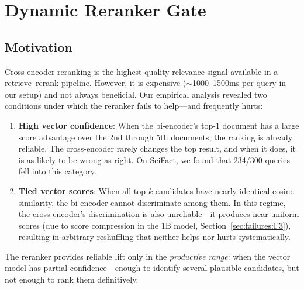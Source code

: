 \documentclass[11pt]{article}
\begin{document}
\section{Dynamic Reranker Gate}
\label{sec:gate}

\subsection{Motivation}

Cross-encoder reranking is the highest-quality relevance signal available in a
retrieve--rerank pipeline. However, it is expensive ($\sim$1000--1500ms per query in
our setup) and not always beneficial. Our empirical analysis revealed two conditions
under which the reranker fails to help---and frequently hurts:

\begin{enumerate}[leftmargin=2em, itemsep=4pt]
  \item \textbf{High vector confidence}: When the bi-encoder's top-1 document has a
  large score advantage over the 2nd through 5th documents, the ranking is already
  reliable. The cross-encoder rarely changes the top result, and when it does, it is as
  likely to be wrong as right. On SciFact, we found that 234/300 queries fell into this
  category.

  \item \textbf{Tied vector scores}: When all top-$k$ candidates have nearly identical
  cosine similarity, the bi-encoder cannot discriminate among them. In this regime, the
  cross-encoder's discrimination is also unreliable---it produces near-uniform scores
  (due to score compression in the 1B model, Section~\ref{sec:failures:F3}), resulting
  in arbitrary reshuffling that neither helps nor hurts systematically.
\end{enumerate}

The reranker provides reliable lift only in the \emph{productive range}: when the
vector model has partial confidence---enough to identify several plausible candidates,
but not enough to rank them definitively.
\end{document}
